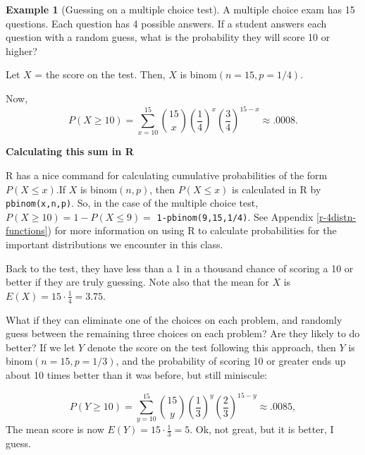 \documentclass[
]{book}
\theoremstyle{definition}
\theoremstyle{definition}
\newtheorem{example}{Example}[chapter]
\theoremstyle{definition}
\theoremstyle{definition}
\theoremstyle{remark}
\begin{document}
\begin{example}[Guessing on a multiple choice test]
\protect\hypertarget{exm:binom-mult-choice-test}{}\label{exm:binom-mult-choice-test}A multiple choice exam has 15 questions. Each question has 4 possible answers. If a student answers each question with a random guess, what is the probability they will score 10 or higher?

Let \(X\) = the score on the test. Then, \(X\) is binom\((n=15,p=1/4)\).

Now, \[P(X \geq 10) = \sum_{x = 10}^{15} \binom{15}{x}\left(\frac{1}{4}\right)^x\left(\frac{3}{4}\right)^{15-x} \approx .0008.\]

\textbf{Calculating this sum in R}

R has a nice command for calculating cumulative probabilities of the form \(P(X \leq x)\).If \(X\) is binom\((n,p)\), then \(P(X \leq x)\) is calculated in R by \texttt{pbinom(x,n,p)}. So, in the case of the multiple choice test, \(P(X \geq 10) = 1 - P(X \leq 9) =\) \texttt{1-pbinom(9,15,1/4)}. See Appendix \ref{r-4distn-functions}) for more information on using R to calculate probabilities for the important distributions we encounter in this class.

Back to the test, they have less than a 1 in a thousand chance of scoring a 10 or better if they are truly guessing. Note also that the mean for \(X\) is \(E(X) = 15 \cdot \frac{1}{4} = 3.75\).

What if they can eliminate one of the choices on each problem, and randomly guess between the remaining three choices on each problem? Are they likely to do better? If we let \(Y\) denote the score on the test following this approach, then \(Y\) is binom\((n=15,p=1/3)\), and the probability of scoring 10 or greater ends up about 10 times better than it was before, but still miniscule:

\[P(Y \geq 10) = \sum_{y = 10}^{15} \binom{15}{y}\left(\frac{1}{3}\right)^y\left(\frac{2}{3}\right)^{15-y} \approx .0085,\]
The mean score is now \(E(Y) = 15\cdot\frac{1}{3} = 5.\) Ok, not great, but it is better, I guess.
\end{example}
\end{document}
